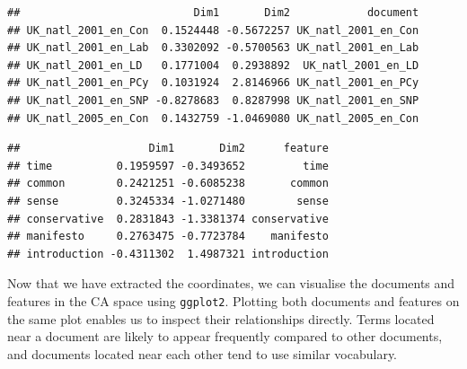 \documentclass[
]{book}
\newenvironment{Shaded}{\begin{snugshade}}{\end{snugshade}}
\newcommand{\CommentTok}[1]{\textcolor[rgb]{0.56,0.35,0.01}{\textit{#1}}}
\newcommand{\FunctionTok}[1]{\textcolor[rgb]{0.13,0.29,0.53}{\textbf{#1}}}
\newcommand{\NormalTok}[1]{#1}
\newcommand{\OtherTok}[1]{\textcolor[rgb]{0.56,0.35,0.01}{#1}}
\newcommand{\SpecialCharTok}[1]{\textcolor[rgb]{0.81,0.36,0.00}{\textbf{#1}}}
\begin{document}
\begin{Shaded}
\end{Shaded}

\begin{verbatim}
##                           Dim1       Dim2            document
## UK_natl_2001_en_Con  0.1524448 -0.5672257 UK_natl_2001_en_Con
## UK_natl_2001_en_Lab  0.3302092 -0.5700563 UK_natl_2001_en_Lab
## UK_natl_2001_en_LD   0.1771004  0.2938892  UK_natl_2001_en_LD
## UK_natl_2001_en_PCy  0.1031924  2.8146966 UK_natl_2001_en_PCy
## UK_natl_2001_en_SNP -0.8278683  0.8287998 UK_natl_2001_en_SNP
## UK_natl_2005_en_Con  0.1432759 -1.0469080 UK_natl_2005_en_Con
\end{verbatim}

\begin{Shaded}
\end{Shaded}

\begin{verbatim}
##                    Dim1       Dim2      feature
## time          0.1959597 -0.3493652         time
## common        0.2421251 -0.6085238       common
## sense         0.3245334 -1.0271480        sense
## conservative  0.2831843 -1.3381374 conservative
## manifesto     0.2763475 -0.7723784    manifesto
## introduction -0.4311302  1.4987321 introduction
\end{verbatim}

Now that we have extracted the coordinates, we can visualise the documents and features in the CA space using \texttt{ggplot2}. Plotting both documents and features on the same plot enables us to inspect their relationships directly. Terms located near a document are likely to appear frequently compared to other documents, and documents located near each other tend to use similar vocabulary.
\end{document}
